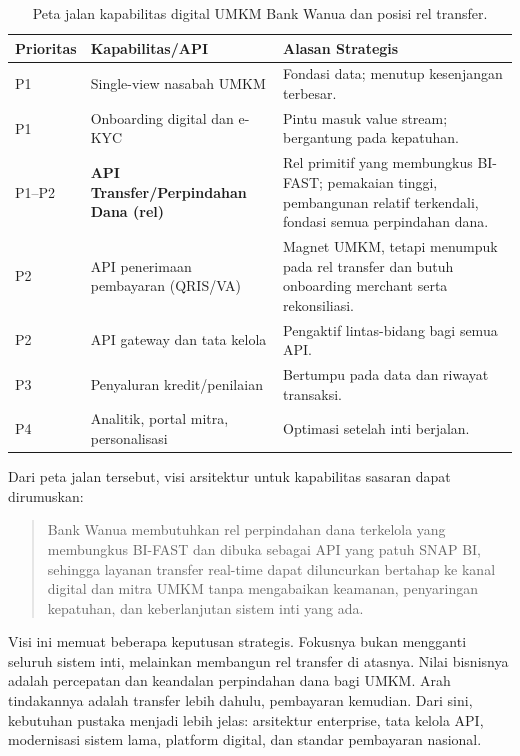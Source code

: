 \begin{table}[htbp]
\centering
\scriptsize
\caption{Peta jalan kapabilitas digital UMKM Bank Wanua dan posisi rel
transfer.}
\label{tab:roadmap-transfer}
\begin{tabularx}{\textwidth}{@{}p{} p{} X@{}}
\hline
\textbf{Prioritas} & \textbf{Kapabilitas/API} & \textbf{Alasan Strategis} \\
\hline
P1 & Single-view nasabah UMKM & Fondasi data; menutup kesenjangan terbesar. \\
P1 & Onboarding digital dan e-KYC & Pintu masuk value stream; bergantung pada
kepatuhan. \\
P1--P2 & \textbf{API Transfer/Perpindahan Dana (rel)} & Rel primitif yang
membungkus BI-FAST; pemakaian tinggi, pembangunan relatif terkendali, fondasi
semua perpindahan dana. \\
P2 & API penerimaan pembayaran (QRIS/VA) & Magnet UMKM, tetapi menumpuk pada
rel transfer dan butuh onboarding merchant serta rekonsiliasi. \\
P2 & API gateway dan tata kelola & Pengaktif lintas-bidang bagi semua API. \\
P3 & Penyaluran kredit/penilaian & Bertumpu pada data dan riwayat transaksi. \\
P4 & Analitik, portal mitra, personalisasi & Optimasi setelah inti berjalan. \\
\hline
\end{tabularx}
\end{table}

Dari peta jalan tersebut, visi arsitektur untuk kapabilitas sasaran dapat
dirumuskan:

\begin{quote}
Bank Wanua membutuhkan rel perpindahan dana terkelola yang membungkus BI-FAST
dan dibuka sebagai API yang patuh SNAP BI, sehingga layanan transfer real-time
dapat diluncurkan bertahap ke kanal digital dan mitra UMKM tanpa mengabaikan
keamanan, penyaringan kepatuhan, dan keberlanjutan sistem inti yang ada.
\end{quote}

Visi ini memuat beberapa keputusan strategis. Fokusnya bukan mengganti seluruh
sistem inti, melainkan membangun rel transfer di atasnya. Nilai bisnisnya adalah
percepatan dan keandalan perpindahan dana bagi UMKM. Arah tindakannya adalah
transfer lebih dahulu, pembayaran kemudian. Dari sini, kebutuhan pustaka menjadi
lebih jelas: arsitektur enterprise, tata kelola API, modernisasi sistem lama,
platform digital, dan standar pembayaran nasional.

